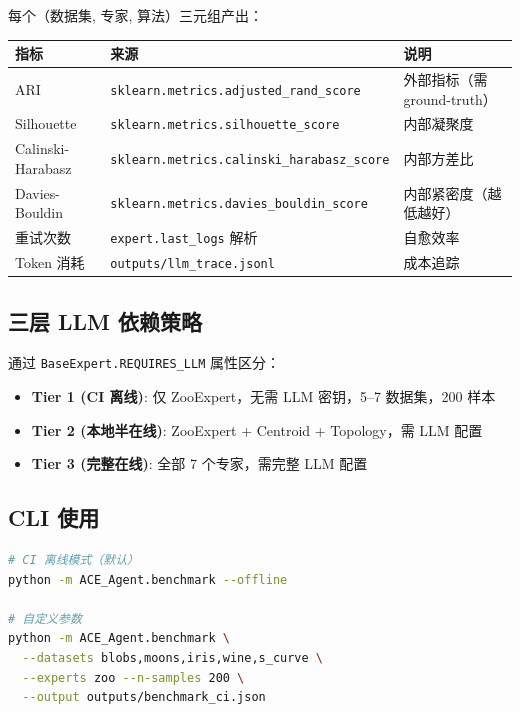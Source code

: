 \documentclass[12pt,a4paper]{article}
\begin{document}
每个（数据集, 专家, 算法）三元组产出：

\begin{table}[H]
\centering
\begin{tabular}{@{}lll@{}}
\toprule
\textbf{指标} & \textbf{来源} & \textbf{说明} \\
\midrule
ARI & \texttt{sklearn.metrics.adjusted\_rand\_score} & 外部指标（需 ground-truth） \\
Silhouette & \texttt{sklearn.metrics.silhouette\_score} & 内部凝聚度 \\
Calinski-Harabasz & \texttt{sklearn.metrics.calinski\_harabasz\_score} & 内部方差比 \\
Davies-Bouldin & \texttt{sklearn.metrics.davies\_bouldin\_score} & 内部紧密度（越低越好） \\
重试次数 & \texttt{expert.last\_logs} 解析 & 自愈效率 \\
Token 消耗 & \texttt{outputs/llm\_trace.jsonl} & 成本追踪 \\
\bottomrule
\end{tabular}
\end{table}

\subsection{三层 LLM 依赖策略}

通过 \texttt{BaseExpert.REQUIRES\_LLM} 属性区分：
\begin{itemize}[nosep]
    \item \textbf{Tier 1 (CI 离线)}: 仅 ZooExpert，无需 LLM 密钥，5–7 数据集，200 样本
    \item \textbf{Tier 2 (本地半在线)}: ZooExpert + Centroid + Topology，需 LLM 配置
    \item \textbf{Tier 3 (完整在线)}: 全部 7 个专家，需完整 LLM 配置
\end{itemize}

\subsection{CLI 使用}

\begin{lstlisting}[language=bash]
# CI 离线模式（默认）
python -m ACE_Agent.benchmark --offline

# 自定义参数
python -m ACE_Agent.benchmark \
  --datasets blobs,moons,iris,wine,s_curve \
  --experts zoo --n-samples 200 \
  --output outputs/benchmark_ci.json
\end{lstlisting}
\end{document}
